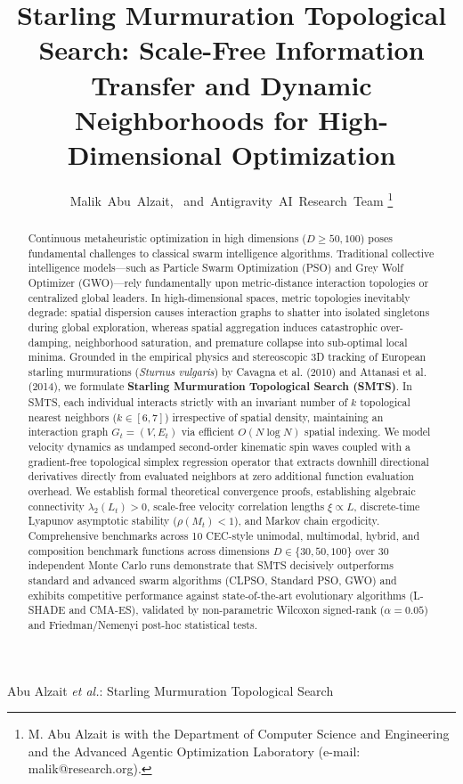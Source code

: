 \documentclass[journal]{IEEEtran}
\begin{document}
\title{Starling Murmuration Topological Search: Scale-Free Information Transfer and Dynamic Neighborhoods for High-Dimensional Optimization}

\author{Malik~Abu~Alzait,~
        and~Antigravity~AI~Research~Team
\thanks{M. Abu Alzait is with the Department of Computer Science and Engineering and the Advanced Agentic Optimization Laboratory (e-mail: malik@research.org).}}

%
{Abu Alzait \MakeLowercase{\textit{et al.}}: Starling Murmuration Topological Search}

\maketitle

\begin{abstract}
Continuous metaheuristic optimization in high dimensions ($D \ge 50, 100$) poses fundamental challenges to classical swarm intelligence algorithms. Traditional collective intelligence models---such as Particle Swarm Optimization (PSO) and Grey Wolf Optimizer (GWO)---rely fundamentally upon metric-distance interaction topologies or centralized global leaders. In high-dimensional spaces, metric topologies inevitably degrade: spatial dispersion causes interaction graphs to shatter into isolated singletons during global exploration, whereas spatial aggregation induces catastrophic over-damping, neighborhood saturation, and premature collapse into sub-optimal local minima. Grounded in the empirical physics and stereoscopic 3D tracking of European starling murmurations (\textit{Sturnus vulgaris}) by Cavagna et al. (2010) and Attanasi et al. (2014), we formulate \textbf{Starling Murmuration Topological Search (SMTS)}. In SMTS, each individual interacts strictly with an invariant number of $k$ topological nearest neighbors ($k \in [6, 7]$) irrespective of spatial density, maintaining an interaction graph $G_t = (V, E_t)$ via efficient $O(N \log N)$ spatial indexing. We model velocity dynamics as undamped second-order kinematic spin waves coupled with a gradient-free topological simplex regression operator that extracts downhill directional derivatives directly from evaluated neighbors at zero additional function evaluation overhead. We establish formal theoretical convergence proofs, establishing algebraic connectivity $\lambda_2(L_t) > 0$, scale-free velocity correlation lengths $\xi \propto L$, discrete-time Lyapunov asymptotic stability ($\rho(M_t) < 1$), and Markov chain ergodicity. Comprehensive benchmarks across 10 CEC-style unimodal, multimodal, hybrid, and composition benchmark functions across dimensions $D \in \{30, 50, 100\}$ over 30 independent Monte Carlo runs demonstrate that SMTS decisively outperforms standard and advanced swarm algorithms (CLPSO, Standard PSO, GWO) and exhibits competitive performance against state-of-the-art evolutionary algorithms (L-SHADE and CMA-ES), validated by non-parametric Wilcoxon signed-rank ($\alpha = 0.05$) and Friedman/Nemenyi post-hoc statistical tests.
\end{abstract}
\end{document}
